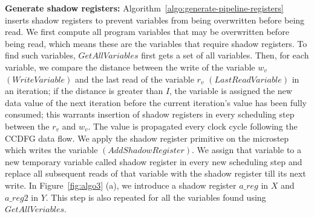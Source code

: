 {\bf Generate shadow registers:} Algorithm~\ref{algo:generate-pipeline-registers} inserts shadow registers
to prevent variables from being overwritten before being read. We first compute all program variables that may be
overwritten before being read, which means these are the variables that require shadow registers. To find such variables,
 $GetAllVariables$ first gets a set of all variables. Then, for each variable, we compare the distance between the write of
  the variable $w_v$ $(WriteVariable)$ and the last read of the variable $r_v$ $(LastReadVariable)$ in an iteration; if the
   distance is greater than $I$, the variable is assigned the new data value of the next iteration before the current iteration's value
    has been fully consumed; this warrants insertion of shadow registers in every scheduling step between the $r_v$ and $w_v$. The value is propagated every clock cycle following the CCDFG data flow.
We apply the shadow register primitive on the microstep which writes the variable $(AddShadowRegister)$. We assign that
 variable to a new temporary variable called shadow register in every new scheduling step and replace all subsequent reads of that variable with the shadow register till its next write. In Figure~\ref{fig:algo3} (a), we introduce a shadow register $a\_reg$ in $X$ and $a\_reg2$ in $Y$. This step is also repeated for all the variables found using $GetAllVeriables$.


